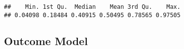 \documentclass[
]{article}
\newenvironment{Shaded}{\begin{snugshade}}{\end{snugshade}}
\newcommand{\KeywordTok}[1]{\textcolor[rgb]{0.13,0.29,0.53}{\textbf{#1}}}
\newcommand{\NormalTok}[1]{#1}
\newcommand{\OperatorTok}[1]{\textcolor[rgb]{0.81,0.36,0.00}{\textbf{#1}}}
\newcommand{\StringTok}[1]{\textcolor[rgb]{0.31,0.60,0.02}{#1}}
\begin{document}
\begin{Shaded}
\end{Shaded}

\begin{verbatim}
##    Min. 1st Qu.  Median    Mean 3rd Qu.    Max. 
## 0.04098 0.18484 0.40915 0.50495 0.78565 0.97505
\end{verbatim}

\hypertarget{outcome-model-1}{%
\subsection{Outcome Model}\label{outcome-model-1}}
\end{document}
